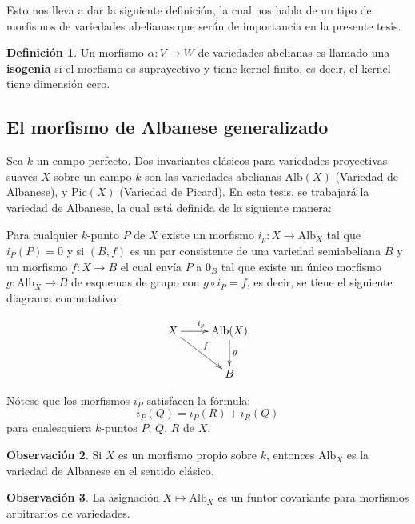 \documentclass[10pt]{amsart}
\theoremstyle{definition}
\newtheorem{definition}{Definici\'on}[section]
\newtheorem{obs}[definition]{Observaci\'on}
\theoremstyle{remark}
\theoremstyle{definition}
\begin{document}
Esto nos lleva a dar la siguiente definición, la cual nos habla de un tipo de morfismos de variedades abelianas que serán de importancia en la presente tesis.


\begin{definition} Un morfismo $\alpha: V \rightarrow W$ de variedades abelianas es llamado una \textbf{isogenia} si el morfismo es suprayectivo y tiene kernel finito, es decir, el kernel tiene dimensión cero. 
\end{definition}


\subsection{El morfismo de Albanese generalizado}
Sea $\mathit{k}$ un campo perfecto. Dos invariantes clásicos para variedades proyectivas suaves $X$ sobre un campo $\mathit{k}$ son las variedades abelianas $\mathrm{Alb}(X)$ (Variedad de Albanese), y $\mathrm{Pic}(X)$ (Variedad de Picard).  En esta tesis, se trabajará la variedad de Albanese, la cual está definida de la siguiente manera:

Para cualquier $\mathit{k}$-punto $P$ de $X$ existe un morfismo $i_{p}:X \rightarrow \mathrm{Alb}_{X}$ tal que $i_{P}(P)=0$ y si $(B,f)$ es un par consistente de una variedad semiabeliana $B$ y un morfismo $f:X \rightarrow B$ el cual envía $P$ a $0_{B}$ tal que existe un único morfismo $g:\mathrm{Alb}_{X} \rightarrow B$ de esquemas de grupo con $g \circ i_{P}=f$, es decir, se tiene el siguiente diagrama conmutativo:

\[ \xymatrix{X \ar[r]^{i_{p}}\ar[dr]^{f}& \mathrm{Alb}(X)\ar[d]^{g}\\
			& B}
\]

Nótese que los morfismos $i_{P}$ satisfacen la fórmula:
\begin{equation*}
i_{P}(Q)=i_{P}(R)+i_{R}(Q)
\end{equation*}
para cualesquiera $\mathit{k}$-puntos $P$, $Q$, $R$ de $X$.

\begin{obs} Si $X$ es un morfismo propio sobre $\mathit{k}$, entonces $\mathrm{Alb}_{X}$ es la variedad de Albanese en el sentido clásico.
\end{obs}

\begin{obs} La asignación $X \mapsto \mathrm{Alb}_{X}$ es un funtor covariante para morfismos arbitrarios de variedades.
\end{obs}
\end{document}
